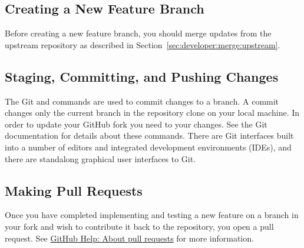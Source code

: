 \subsection{Creating a New Feature Branch}
\label{sec:developer:create:branch}

Before creating a new feature branch, you should merge updates from
the upstream repository as described in Section~\vref{sec:developer:merge:upstream}.


\subsection{Staging, Committing, and Pushing Changes}
\label{sec:developer:commit}

The Git  and  commands are used
to commit changes to a branch. A commit changes only the current
branch in the repository clone on your local machine. In order to
update your GitHub fork you need to  your
changes. See the Git documentation for details about these
commands. There are Git interfaces built into a number of editors and
integrated development environments (IDEs), and there are standalong
graphical user interfaces to Git.


\subsection{Making Pull Requests}
\label{sec:developer:create:pull:request}

Once you have completed implementing and testing a new feature on a
branch in your fork and wish to contribute it back to the
 repository, you open a pull
request. See
\href{https://help.github.com/articles/about-pull-requests/}{GitHub
  Help: About pull requests} for more information.


